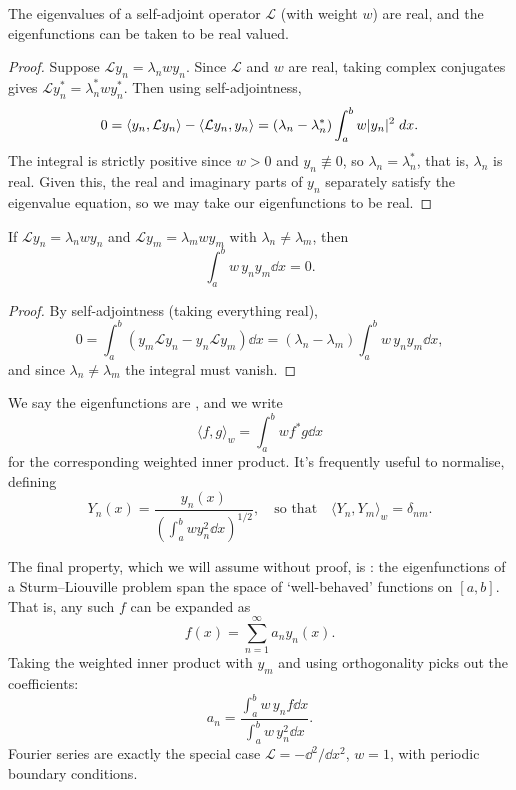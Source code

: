\documentclass[a4paper]{scrartcl}
\begin{document}
\begin{proposition}
    The eigenvalues of a self-adjoint operator $\mathcal{L}$ (with weight $w$) are real, and the eigenfunctions can be taken to be real valued.
\end{proposition}
\begin{proof}
    Suppose $\mathcal{L} y_n = \lambda_n w y_n$. Since $\mathcal{L}$ and $w$ are real, taking complex conjugates gives $\mathcal{L} y_n^* = \lambda_n^* w y_n^*$.
    Then using self-adjointness,
    $$
    0 = \langle y_n , \mathcal{L} y_n \rangle - \langle \mathcal{L} y_n, y_n \rangle = (\lambda_n - \lambda_n^*)\int_a^b w \lvert y_n\rvert^2 \; d x.
    $$
    The integral is strictly positive since $w > 0$ and $y_n \not\equiv 0$, so $\lambda_n = \lambda_n^*$, that is, $\lambda_n$ is real.
    Given this, the real and imaginary parts of $y_n$ separately satisfy the eigenvalue equation, so we may take our eigenfunctions to be real.
\end{proof}

\begin{proposition}
    If $\mathcal{L} y_n = \lambda_n w y_n$ and $\mathcal{L}y_m = \lambda_m w y_m$ with $\lambda_n \neq \lambda_m$, then
    $$
    \int_a^b w\, y_n y_m \dd x = 0.
    $$
\end{proposition}
\begin{proof}
    By self-adjointness (taking everything real),
    $$
    0 = \int_a^b \left(y_m \mathcal{L} y_n - y_n \mathcal{L}y_m\right) \dd x = (\lambda_n - \lambda_m) \int_a^b w \, y_n y_m \dd x,
    $$
    and since $\lambda_n \neq \lambda_m$ the integral must vanish.
\end{proof}

We say the eigenfunctions are , and we write
$$
\langle f, g \rangle_w = \int_a^b w f^* g \dd x
$$
for the corresponding weighted inner product. It's frequently useful to normalise, defining
$$
Y_n(x) = \frac{y_n(x)}{\left(\int_a^b w y_n^2 \dd x\right)^{1/2}}, \quad \text{so that} \quad \langle Y_n, Y_m \rangle_w = \delta_{nm}.
$$

The final property, which we will assume without proof, is : the eigenfunctions of a Sturm--Liouville problem span the space of `well-behaved' functions on $[a, b]$. That is, any such $f$ can be expanded as
$$
f(x) = \sum_{n = 1}^{\infty} a_n y_n(x).
$$
Taking the weighted inner product with $y_m$ and using orthogonality picks out the coefficients:
$$
a_n = \frac{\int_a^b w\, y_n f \dd x}{\int_a^b w \,y_n^2 \dd x}.
$$
Fourier series are exactly the special case $\mathcal{L} = -\dd^2/\dd x^2$, $w = 1$, with periodic boundary conditions.
\end{document}
